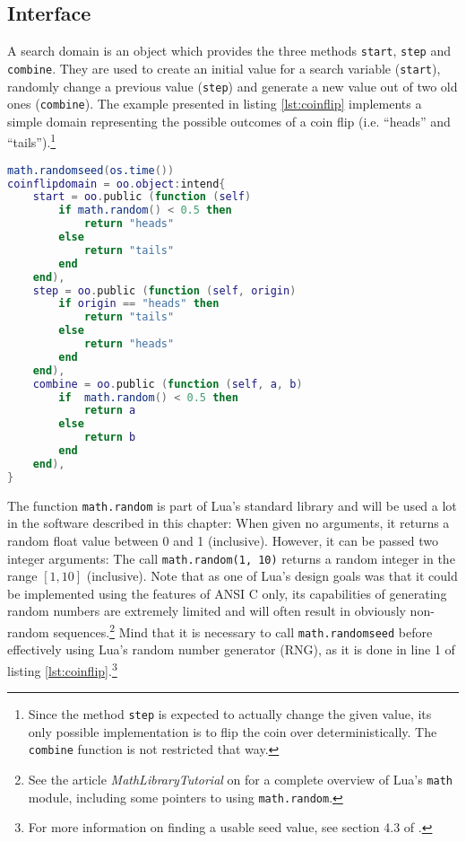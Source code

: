 \subsection{Interface}
\label{sec:evolution:domain}

A search domain is an object which provides the three methods \texttt{start}, \texttt{step} and \texttt{combine}. They are used to create an initial value for a search variable (\texttt{start}), randomly change a previous value (\texttt{step}) and generate a new value out of two old ones (\texttt{combine}). The example presented in listing \ref{lst:coinflip} implements a simple domain representing the possible outcomes of a coin flip (i.e. ``heads'' and ``tails'').\footnote{Since the method \texttt{step} is expected to actually change the given value, its only possible implementation is to flip the coin over deterministically. The \texttt{combine} function is not restricted that way.}

\begin{lstlisting}[language=lua, caption={A domain representing the results of a coin flip}, label=lst:coinflip, name=lst:coinflip]
math.randomseed(os.time())
coinflipdomain = oo.object:intend{
	start = oo.public (function (self)
		if math.random() < 0.5 then
			return "heads"
		else
			return "tails"
		end
	end),
	step = oo.public (function (self, origin)
		if origin == "heads" then
			return "tails"
		else
			return "heads"
		end
	end),
	combine = oo.public (function (self, a, b)
		if  math.random() < 0.5 then
			return a
		else
			return b
		end
	end),
}
\end{lstlisting}

The function \texttt{math.random} is part of Lua's standard library and will be used a lot in the software described in this chapter: When given no arguments, it returns a random float value between 0 and 1 (inclusive). However, it can be passed two integer arguments: The call \texttt{math.random(1, 10)} returns a random integer in the range $[1, 10]$ (inclusive). Note that as one of Lua's design goals was that it could be implemented using the features of ANSI C only, its capabilities of generating random numbers are extremely limited and will often result in obviously non-random sequences.\footnote{See the article \emph{MathLibraryTutorial} on \cite{LuaUsersWiki} for a complete overview of Lua's \texttt{math} module, including some pointers to using \texttt{math.random}.} Mind that it is necessary to call \texttt{math.randomseed} before effectively using Lua's random number generator (RNG), as it is done in line 1 of listing \ref{lst:coinflip}.\footnote{For more information on finding a usable seed value, see section 4.3 of \cite{Viega2003}.}

